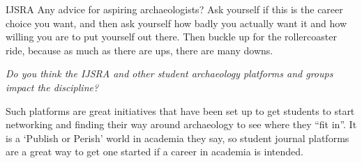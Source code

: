 \begin{labeling}{IJSRA}
Any advice for aspiring archaeologists? Ask yourself if this is the career choice you want, and then ask yourself how badly you actually want it and how willing you are to put yourself out there. Then buckle up for the rollercoaster ride, because as much as there are ups, there are many downs. 

\item[IJSRA] \emph{Do you think the IJSRA and other student archaeology platforms and groups impact the discipline?}
	
\item[KM]
Such platforms are great initiatives that have been set up to get students to start networking and finding their way around archaeology to see where they “fit in”. It is a ‘Publish or Perish’ world in academia they say, so student journal platforms are a great way to get one started if a career in academia is intended.
 
\end{labeling}
\nocite{Summers1995,Pithouse2010}
\IJSRAclosing
